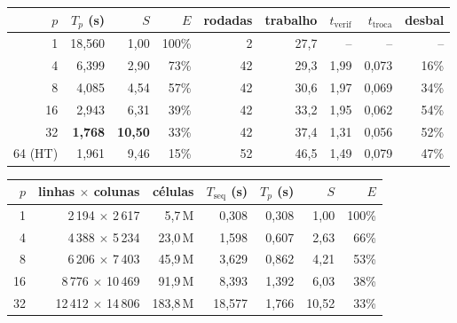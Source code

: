 \documentclass[9pt,a4paper]{extarticle}
\begin{document}
\begin{minipage}[t]{0.56\linewidth}
\centering\small\setlength{\tabcolsep}{3.5pt}
\begin{tabular}{rrrrrrrrr}\toprule
$p$ & $T_p$ (s) & $S$ & $E$ & rodadas & trabalho & $t_{\mathrm{verif}}$ & $t_{\mathrm{troca}}$ & desbal\\\midrule
1  & 18,560 & 1,00  & 100\% & 2  & 27,7 & -- & -- & -- \\
4  & 6,399  & 2,90  & 73\%  & 42 & 29,3 & 1,99 & 0,073 & 16\% \\
8  & 4,085  & 4,54  & 57\%  & 42 & 30,6 & 1,97 & 0,069 & 34\% \\
16 & 2,943  & 6,31  & 39\%  & 42 & 33,2 & 1,95 & 0,062 & 54\% \\
32 & \textbf{1,768} & \textbf{10,50} & 33\% & 42 & 37,4 & 1,31 & 0,056 & 52\% \\
64 (HT) & 1,961 & 9,46 & 15\% & 52 & 46,5 & 1,49 & 0,079 & 47\% \\\bottomrule
\end{tabular}

\vspace{6pt}
\begin{tabular}{rrrrrrr}\toprule
$p$ & linhas $\times$ colunas & células & $T_{\mathrm{seq}}$ (s) & $T_p$ (s) & $S$ & $E$\\\midrule
1  & 2\,194 $\times$ 2\,617   & 5,7\,M  & 0,308  & 0,308 & 1,00  & 100\% \\
4  & 4\,388 $\times$ 5\,234   & 23,0\,M & 1,598  & 0,607 & 2,63  & 66\% \\
8  & 6\,206 $\times$ 7\,403   & 45,9\,M & 3,629  & 0,862 & 4,21  & 53\% \\
16 & 8\,776 $\times$ 10\,469  & 91,9\,M & 8,393  & 1,392 & 6,03  & 38\% \\
32 & 12\,412 $\times$ 14\,806 & 183,8\,M & 18,577 & 1,766 & 10,52 & 33\% \\\bottomrule
\end{tabular}
\end{minipage}\hfill
\end{document}
